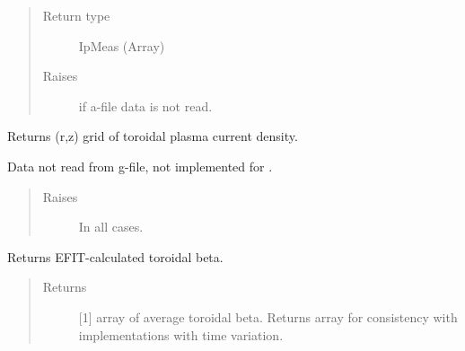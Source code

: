 \documentclass[letterpaper,10pt,english]{sphinxmanual}
\begin{document}
\begin{fulllineitems}
\begin{fulllineitems}
\begin{quote}
\begin{description}
\item[{Return type}] \leavevmode
IpMeas (Array)

\item[{Raises}] \leavevmode
{} \textendash{} if a-file data is not read.

\end{description}\end{quote}

\end{fulllineitems}


\begin{fulllineitems}
\label{\detokenize{eqtools:eqtools.eqdskreader.EqdskReader.getJp}}
Returns (r,z) grid of toroidal plasma current density.

Data not read from g-file, not implemented for {\hyperref[\detokenize{eqtools:eqtools.eqdskreader.EqdskReader}]{}}.
\begin{quote}\begin{description}
\item[{Raises}] \leavevmode
{} \textendash{} In all cases.

\end{description}\end{quote}

\end{fulllineitems}


\begin{fulllineitems}
\label{\detokenize{eqtools:eqtools.eqdskreader.EqdskReader.getBetaT}}
Returns EFIT-calculated toroidal beta.
\begin{quote}\begin{description}
\item[{Returns}] \leavevmode
{[}1{]} array of average toroidal beta.  Returns array
for consistency with
{\hyperref[\detokenize{eqtools:eqtools.core.Equilibrium}]{}}
implementations with time variation.


\end{description}
\end{quote}
\end{fulllineitems}
\end{fulllineitems}
\end{document}
